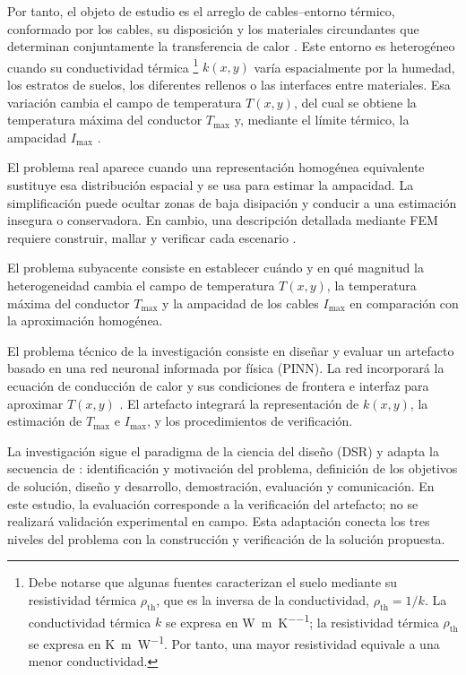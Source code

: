 \documentclass[11pt,a4paper,oneside]{report}
\newcommand{\Tmax}{T_{\max}}
\newcommand{\Imax}{I_{\max}}
\newcommand{\kx}{k(x,y)}
\newcommand{\rhoth}{\rho_{\mathrm{th}}}
\begin{document}
Por tanto, el objeto de estudio es el arreglo de cables--entorno térmico, conformado por los cables, su disposición y los materiales circundantes que determinan conjuntamente la transferencia de calor \parencites[1--3]{enescu2020}[41--42]{cigre2025}. Este entorno es heterogéneo cuando su conductividad térmica \footnote{Debe notarse que algunas fuentes caracterizan el suelo mediante su resistividad térmica \(\rhoth\), que es la inversa de la conductividad, \(\rhoth=1/k\). La conductividad térmica $k$ se expresa en \si{\watt\per\metre\per\kelvin}; la resistividad térmica $\rhoth$ se expresa en \si{\kelvin\metre\per\watt}. Por tanto, una mayor resistividad equivale a una menor conductividad.} \(\kx\) varía espacialmente por la humedad, los estratos de suelos, los diferentes rellenos o las interfaces entre materiales. Esa variación cambia el campo de temperatura \(T(x,y)\), del cual se obtiene la temperatura máxima del conductor \(\Tmax\) y, mediante el límite térmico, la ampacidad \(\Imax\) \parencites[3--4]{enescu2021}[1,6--7]{khumalo2025}[3]{xing2023}.

El problema real aparece cuando una representación homogénea equivalente sustituye esa distribución espacial y se usa para estimar la ampacidad. La simplificación puede ocultar zonas de baja disipación y conducir a una estimación insegura o conservadora. En cambio, una descripción detallada mediante FEM requiere construir, mallar y verificar cada escenario \parencites[41--42,93--99]{cigre2025}[1--3,12]{aldulaimi2024}. 

El problema subyacente consiste en establecer cuándo y en qué magnitud la heterogeneidad cambia el campo de temperatura \(T(x,y)\), la temperatura máxima del conductor \(\Tmax\) y la ampacidad de los cables \(\Imax\) en comparación con la aproximación homogénea.

El problema técnico de la investigación consiste en diseñar y evaluar un artefacto basado en una red neuronal informada por física (PINN). La red incorporará la ecuación de conducción de calor y sus condiciones de frontera e interfaz para aproximar \(T(x,y)\) \parencite{raissi2019}. El artefacto integrará la representación de \(\kx\), la estimación de \(\Tmax\) e \(\Imax\), y los procedimientos de verificación.

La investigación sigue el paradigma de la ciencia del diseño (DSR) y adapta la secuencia de \textcite[54--56]{peffers2007}: identificación y motivación del problema, definición de los objetivos de solución, diseño y desarrollo, demostración, evaluación y comunicación. En este estudio, la evaluación corresponde a la verificación del artefacto; no se realizará validación experimental en campo. Esta adaptación conecta los tres niveles del problema con la construcción y verificación de la solución propuesta.
\end{document}

